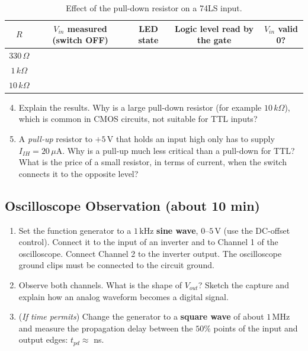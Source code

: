 \documentclass{article}
\begin{document}
\begin{table}[H]
    \centering
    \begin{tabular}{|c|c|c|c|c|}
        \hline
        $R$ & $V_{in}$ measured (switch OFF) & LED state & Logic level read by the gate & $V_{in}$ valid 0? \\
        \hline
        $330\,\Omega$ & & & & \\ \hline
        $1\,k\Omega$ & & & & \\ \hline
        $10\,k\Omega$ & & & & \\ \hline
    \end{tabular}
    \caption{Effect of the pull-down resistor on a 74LS input.}
    \label{tab:pulldown}
\end{table}

\begin{enumerate}
    \setcounter{enumi}{3}
    \item Explain the results. Why is a large pull-down resistor (for example $10\,k\Omega$), which is common in CMOS circuits, not suitable for TTL inputs?
    \item A \emph{pull-up} resistor to $+5\,\mathrm{V}$ that holds an input high only has to supply $I_{IH} = 20\,\mu\mathrm{A}$. Why is a pull-up much less critical than a pull-down for TTL? What is the price of a small resistor, in terms of current, when the switch connects it to the opposite level?
\end{enumerate}

\subsection*{Oscilloscope Observation (about 10 min)}
\begin{enumerate}
    \item Set the function generator to a $1\,\mathrm{kHz}$ \textbf{sine wave}, $0$--$5\,\mathrm{V}$ (use the DC-offset control). Connect it to the input of an inverter and to Channel 1 of the oscilloscope. Connect Channel 2 to the inverter output. The oscilloscope ground clips must be connected to the circuit ground.
    \item Observe both channels. What is the shape of $V_{out}$? \underline{\hspace{4cm}} Sketch the capture and explain how an analog waveform becomes a digital signal.
    \item (\textit{If time permits}) Change the generator to a \textbf{square wave} of about $1\,\mathrm{MHz}$ and measure the propagation delay between the $50\%$ points of the input and output edges: $t_{pd}\approx$ \underline{\hspace{2cm}} ns.
\end{enumerate}
\end{document}
